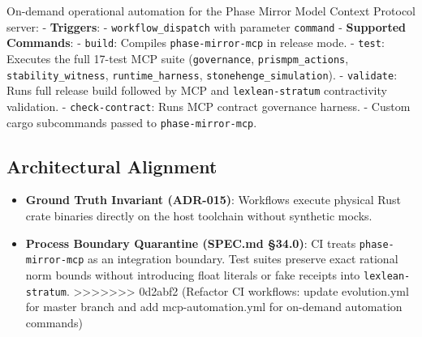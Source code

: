 \documentclass[
]{article}
\providecommand{\tightlist}{%
  \setlength{\itemsep}{0pt}\setlength{\parskip}{0pt}}
\begin{document}
On-demand operational automation for the Phase Mirror Model Context
Protocol server: - \textbf{Triggers}: - \texttt{workflow\_dispatch} with
parameter \texttt{command} - \textbf{Supported Commands}: -
\texttt{build}: Compiles \texttt{phase-mirror-mcp} in release mode. -
\texttt{test}: Executes the full 17-test MCP suite (\texttt{governance},
\texttt{prismpm\_actions}, \texttt{stability\_witness},
\texttt{runtime\_harness}, \texttt{stonehenge\_simulation}). -
\texttt{validate}: Runs full release build followed by MCP and
\texttt{lexlean-stratum} contractivity validation. -
\texttt{check-contract}: Runs MCP contract governance harness. - Custom
cargo subcommands passed to \texttt{phase-mirror-mcp}.

\hypertarget{architectural-alignment}{%
\subsection{Architectural Alignment}\label{architectural-alignment}}

\begin{itemize}
\tightlist
\item
  \textbf{Ground Truth Invariant (ADR-015)}: Workflows execute physical
  Rust crate binaries directly on the host toolchain without synthetic
  mocks.
\item
  \textbf{Process Boundary Quarantine (SPEC.md §34.0)}: CI treats
  \texttt{phase-mirror-mcp} as an integration boundary. Test suites
  preserve exact rational norm bounds without introducing float literals
  or fake receipts into \texttt{lexlean-stratum}.
  \textgreater\textgreater\textgreater\textgreater\textgreater\textgreater\textgreater{}
  0d2abf2 (Refactor CI workflows: update evolution.yml for master branch
  and add mcp-automation.yml for on-demand automation commands)
\end{itemize}
\end{document}
